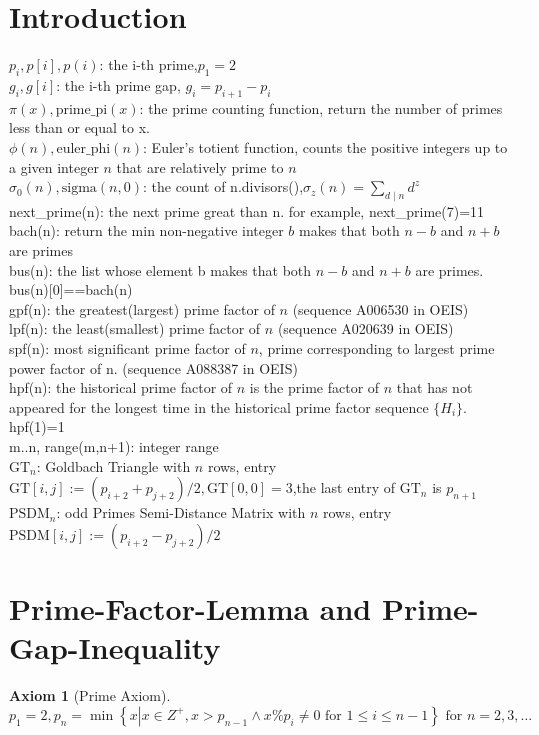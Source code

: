 \documentclass[12pt,a4paper,reqno]{amsart}
\numberwithin{equation}{section}
\theoremstyle{plain}
\newtheorem{axiom}[theorem]{Axiom}
\theoremstyle{definition}
\begin{document}
	
	\section{Introduction}
	$p_i,p[i],p(i)$: the i-th prime,$p_1=2$ \\
	$g_i,g[i]$: the i-th prime gap, $g_i = p_{i + 1} - p_i$ \\
	$\pi(x), \text{prime\_pi}(x)$: the prime counting function, return the number of primes less than or equal to x. \\
	$\phi(n), \text{euler\_phi}(n)$: Euler's totient function, counts the positive integers up to a given integer $n$ that are relatively prime to $n$\\
	$\sigma_0(n), \text{sigma}(n,0)$: the count of n.divisors(),${\sigma _{z}(n)=\sum _{d\mid n}d^{z}}$ \\
	next\_prime(n): the next prime great than n. for example, next\_prime(7)=11 \\
	bach(n): return the min non-negative integer $b$ makes that both $n-b$  and $n+b$ are primes \\
	bus(n): the list whose element b makes that both $n-b$ and $n+b$ are primes. bus(n)[0]==bach(n) \\
	gpf(n): the greatest(largest) prime factor of $n$ (sequence A006530 in OEIS)\\
	lpf(n): the least(smallest) prime factor of $n$ (sequence A020639 in OEIS)\\
	spf(n): most significant prime factor of $n$, 
		prime corresponding to largest prime power factor of n. (sequence A088387 in OEIS)\\
	hpf(n): the historical prime factor of $n$ is the prime factor of $n$ that has not appeared for the longest time in the historical prime factor sequence $\{H_i\}$. hpf(1)=1\\
	m..n, range(m,n+1): integer range \\
	$\text{GT}_n$: Goldbach Triangle with $n$ rows, entry $\text{GT}[i,j]:=(p_{i+2}+p_{j+2})/2, \text{GT}[0,0]=3$,the last entry of $\text{GT}_n$ is $p_{n+1}$ \\
	$\text{PSDM}_n$: odd Primes Semi-Distance Matrix with $n$ rows, entry $\text{PSDM}[i,j]:=(p_{i+2}-p_{j+2})/2$
	
	\section{Prime-Factor-Lemma and Prime-Gap-Inequality}
	\begin{axiom}[Prime Axiom]\label{PrimeAxiom}
		\[p_1=2,p_n=\min  \left\{x\left|x\in Z^+\right.,x>p_{n-1}\land x\%  p_i\neq 0 \text{ for } 1\leq i\leq n-1\right\} \text{ for }n=2,3,\dots\]
	\end{axiom}
	
\end{document}
